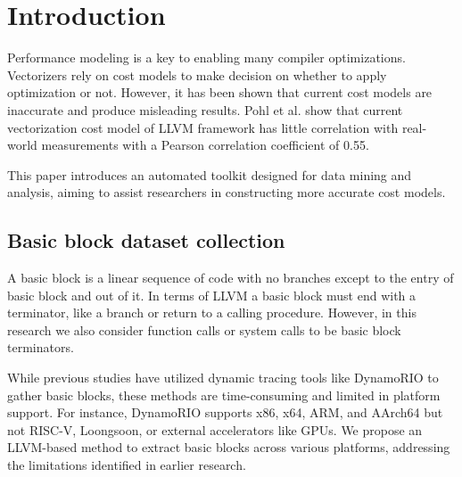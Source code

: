 \section{Introduction}
Performance modeling is a key to enabling many compiler optimizations. Vectorizers rely on cost models to 
make decision on whether to apply optimization or not. However, it has been shown that current cost models
are inaccurate and produce misleading results. Pohl et al.\cite{pohlPortableCostModeling2019} show that
current vectorization cost model of LLVM framework has little correlation with real-world measurements 
with a Pearson correlation coefficient of 0.55.

This paper introduces an automated toolkit designed for data mining and analysis, aiming to assist 
researchers in constructing more accurate cost models.

\subsection{Basic block dataset collection}

A basic block is a linear sequence of code with no branches except to the entry of basic block and out 
of it. In terms of LLVM a basic block must end with a terminator, like a branch or return to a calling 
procedure. However, in this research we also consider function calls or system calls to be basic block 
terminators.

While previous studies have utilized dynamic tracing tools like DynamoRIO\cite{chenBHiveBenchmarkSuite2019} 
to gather basic blocks, these methods are time-consuming and limited in platform support. For instance, 
DynamoRIO supports x86, x64, ARM, and AArch64\cite{brueningInfrastructureAdaptiveDynamic2003} but not 
RISC-V, Loongsoon, or external accelerators like GPUs. We propose an LLVM-based method to extract basic 
blocks across various platforms, addressing the limitations identified in earlier research.

